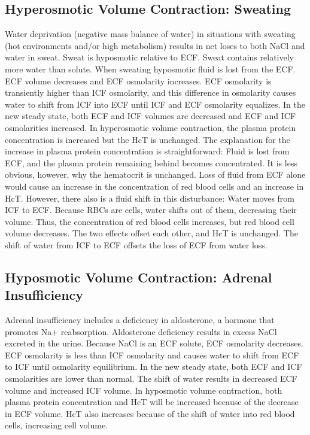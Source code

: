 \subsection{Hyperosmotic Volume Contraction: Sweating}

Water deprivation (negative mass balance of water) in situations with sweating (hot environments and/or high metabolism) results in net loses to both NaCl and water in sweat. Sweat is hyposmotic relative to ECF. Sweat contains relatively more water than solute. When sweating hyposmotic fluid is lost from the ECF. ECF volume decreases and ECF osmolarity increases. ECF osmolarity is transiently higher than ICF osmolarity, and this difference in osmolarity causes water to shift from ICF into ECF until ICF and ECF osmolarity  equalizes. In the new steady state, both ECF and ICF volumes are decreased and ECF and ICF osmolarities increased. In hyperosmotic volume contraction, the plasma protein concentration is increased but the HcT is unchanged. The explanation for the increase in plasma protein concentration is straightforward: Fluid is lost from ECF, and the plasma protein remaining behind becomes concentrated. It is less obvious, however, why the hematocrit is unchanged. Loss of fluid from ECF alone would cause an increase in the concentration of red blood cells and an increase in HcT. However, there also is a fluid shift in this disturbance: Water moves from ICF to ECF. Because RBCs are cells, water shifts out of them, decreasing their volume. Thus, the concentration of red blood cells increases, but red blood cell volume decreases. The two effects offset each other, and HcT is unchanged. The shift of water from ICF to ECF offsets the loss of ECF from water loss.

\subsection{Hyposmotic Volume Contraction: Adrenal Insufficiency}

Adrenal insufficiency includes a deficiency in aldosterone, a hormone that promotes Na+ reabsorption. Aldosterone deficiency results in excess NaCl excreted in the urine. Because NaCl is an ECF solute, ECF osmolarity decreases. ECF osmolarity is less than ICF osmolarity and causes water to shift from ECF to ICF until osmolarity equilibrium. In the new steady state, both ECF and ICF osmolarities are lower than normal. The shift of water results in decreased ECF volume and increased ICF volume. In hyposmotic volume contraction, both plasma protein concentration and HcT will be increased because of the decrease in ECF volume. HcT also increases because of the shift of water into red blood cells, increasing cell volume. 


